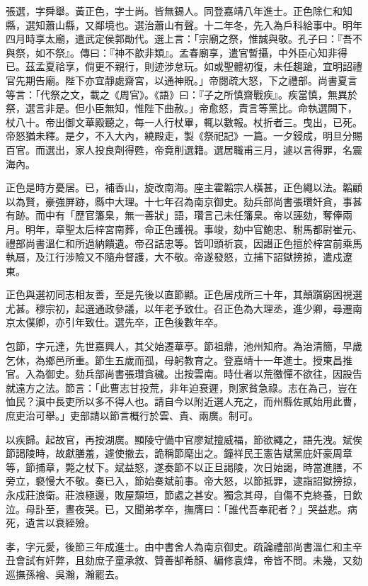 \begin{pinyinscope}
{{張選，字舜舉。黃正色，字士尚。皆無錫人。同登嘉靖八年進士。正色除仁和知縣，選知蕭山縣，又鄰境也。選治蕭山有聲。十二年冬，先入為戶科給事中。明年四月時享太廟，遣武定侯郭勛代。選上言：「宗廟之祭，惟誠與敬。孔子曰：『吾不與祭，如不祭』。傳曰：『神不歆非類』。孟春廟享，遣官暫攝，中外臣心知非得已。茲孟夏祫享，倘更不親行，則迹涉怠玩。如或聖體初復，未任趨蹌，宜明詔禮官先期告廟。陛下亦宜靜處齋宮，以通神貺。」帝閱疏大怒，下之禮部。尚書夏言等言：「代祭之文，載之《周官》。《語》曰：『子之所慎齋戰疾』。疾當慎，無異於祭，選言非是。但小臣無知，惟陛下曲赦。」帝愈怒，責言等黨比。命執選闕下，杖八十。帝出御文華殿聽之，每一人行杖畢，輒以數報。杖折者三。曳出，已死。帝怒猶未釋。是夕，不入大內，繞殿走，製《祭祀記》一篇。一夕鋟成，明旦分賜百官。而選出，家人投良劑得甦，帝竟削選籍。選居職甫三月，遽以言得罪，名震海內。

正色是時方憂居。已，補香山，旋改南海。座主霍韜宗人橫甚，正色繩以法。韜顧以為賢，豪強屏跡，縣中大理。十七年召為南京御史。劾兵部尚書張瓚奸貪，事甚有跡。而中有「歷官籓臬，無一善狀」語，瓚言己未任籓臬。帝以誣劾，奪俸兩月。明年，章聖太后梓宮南葬，命正色護視。事竣，劾中官鮑忠、駙馬都尉崔元、禮部尚書溫仁和所過納饋遺。帝召詰忠等。皆叩頭祈哀，因譖正色擅於梓宮前乘馬執扇，及江行涉險又不隨舟督護，大不敬。帝遂發怒，立捕下詔獄搒掠，遣戍遼東。

正色與選初同志相友善，至是先後以直節顯。正色居戍所三十年，其顛躓窮困視選尤甚。穆宗初，起選通政參議，以年老予致仕。召正色為大理丞，進少卿，尋遷南京太僕卿，亦引年致仕。選先卒，正色後數年卒。

包節，字元達，先世嘉興人，其父始遷華亭。節祖鼎，池州知府。為治清簡，早歲乞休，為鄉邑所重。節生五歲而孤，母躬教育之。登嘉靖十一年進士。授東昌推官。入為御史。劾兵部尚書張瓚貪穢。出按雲南。時仕者以荒徼憚不欲往，因設告就遠方之法。節言：「此曹志甘投荒，非年迫衰遲，則家貧急祿。志在為己，豈在恤民？滇中長吏所以多不得人也。請自今以附近選人充之，而州縣佐貳始用此曹，庶吏治可舉。」吏部請以節言概行於雲、貴、兩廣。制可。

以疾歸。起故官，再按湖廣。顯陵守備中官廖斌擅威福，節欲繩之，語先洩。斌俟節謁陵時，故獻膳羞，遽使撤去，詭稱節麾出之。鐘祥民王憲告斌黨庇奸豪周章等，節捕章，斃之杖下。斌益怒，遂奏節不以正旦謁陵，次日始謁，時當進膳，不旁立，褻慢大不敬。奏已入，節始奏斌前事。帝大怒，以節抵罪，逮詣詔獄搒掠，永戍莊浪衛。莊浪極邊，敗屋頹垣，節處之甚安。獨念其母，自傷不克終養，日飲泣。母訃至，晝夜哭。已，又聞弟孝卒，撫膺曰：「誰代吾奉祀者？」哭益悲。病死，遺言以衰絰殮。

孝，字元愛，後節三年成進士。由中書舍人為南京御史。疏論禮部尚書溫仁和主辛丑會試有奸弊，且劾庶子童承敘、贊善郜希顏、編修袁煒，帝皆不問。未幾，又劾巡撫孫襘、吳瀚，瀚罷去。

}}
\end{pinyinscope}
